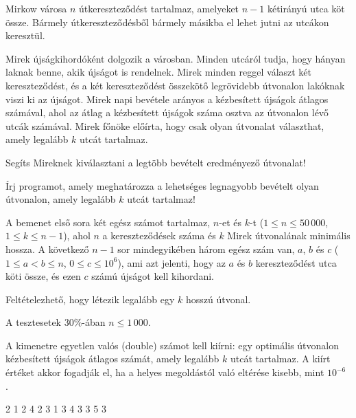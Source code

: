 





Mirkow városa $n$ útkereszteződést tartalmaz, amelyeket $n-1$ kétirányú utca köt össze. Bármely út\-ke\-resz\-te\-ző\-dés\-ből bármely másikba el lehet jutni az utcákon keresztül.

Mirek újságkihordóként dolgozik a városban. Minden utcáról tudja, hogy hányan laknak benne, akik újságot is rendelnek. Mirek minden reggel választ két kereszteződést, és a két kereszteződést összekötő legrövidebb útvonalon lakóknak viszi ki az újságot. Mirek napi bevétele arányos a kézbesített újságok átlagos számával, ahol az átlag a kézbesített újságok száma osztva az útvonalon lévő utcák számával. Mirek főnöke előírta, hogy csak olyan útvonalat választhat, amely legalább $k$ utcát tartalmaz.

Segíts Mireknek kiválasztani a legtöbb bevételt eredményező útvonalat!

Írj programot, amely meghatározza a lehetséges legnagyobb bevételt olyan útvonalon, amely legalább $k$ utcát tartalmaz!

A bemenet első sora két egész számot tartalmaz, $n$-et és $k$-t ($1 \le n \le 50\,000$, $1 \le k \le n - 1$), ahol $n$ a kereszteződések száma és $k$ Mirek útvonalának minimális hossza. A következő $n-1$ sor mindegyikében három egész szám van, $a$, $b$ és $c$ ($1 \le a < b \le n$, $0 \le c \le 10^6$), ami azt jelenti, hogy az $a$ és $b$ kereszteződést utca köti össze, és ezen $c$ számú újságot kell kihordani.

Feltételezhető, hogy létezik legalább egy $k$ hosszú útvonal.

A tesztesetek $30\%$-ában $n \le 1\,000$.

A kimenetre egyetlen valós (double) számot kell kiírni: egy optimális útvonalon kézbesített újságok átlagos számát, amely legalább $k$ utcát tartalmaz.
A kiírt értéket akkor fogadják el, ha a helyes megoldástól való eltérése kisebb, mint $10^{-6}$ .


 2
1 2 4
2 3 1
3 4 3
3 5 3
\sampleEND



